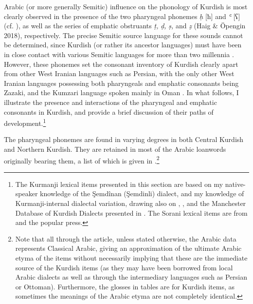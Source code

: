 \documentclass[output=paper]{langsci/langscibook}
\begin{document}
Arabic (or more generally Semitic) influence on the phonology of Kurdish is most clearly observed in the presence of the two pharyngeal phonemes \textit{ḥ} [ħ] and \textit{ʿ} [ʕ] (cf. \citealt{Kahn1976,Haig2007,Anonbyforthcoming,Barryforthcoming}), as well as the series of emphatic obstruants \textit{ṭ,} \textit{ḍ,} \textit{ṣ,} and \textit{ẓ} (Haig \& Öpengin 2018), respectively. The precise Semitic source language for these sounds cannot be determined, since Kurdish (or rather its ancestor languages) must have been in close contact with various Semitic languages for more than two millennia \citep[69]{Utas2005}. However, these phonemes set the consonant inventory of Kurdish clearly apart from other West Iranian languages such as Persian, with the only other West Iranian languages possessing both pharyngeals and emphatic consonants being Zazaki, and the Kumzari language spoken mainly in Oman \citep{Anonbyforthcoming}. In what follows, I illustrate the presence and interactions of the pharyngeal and emphatic consonants in Kurdish, and provide a brief discussion of their paths of development.\footnote{The Kurmanji lexical items presented in this section are based on my native-speaker knowledge of the Şemdînan (Şemdinli) dialect, and my knowledge of Kurmanji-internal dialectal variation, drawing also on \citep{Chyet2003}, \citep{ÖpenginHaig2014}, and the  Manchester Database of Kurdish Dialects presented in \citep{MatrasKoontz-Garboden2016}. The Sorani lexical items are from \citet{Öpengin2016} and the popular press.}  

The pharyngeal phonemes are found in varying degrees in both Central Kurdish and Northern Kurdish. They are retained in most of the Arabic loanwords originally bearing them, a list of which is given in .\footnote{Note that all through the article, unless stated otherwise, the Arabic data represents Classical Arabic, giving an approximation of the ultimate Arabic etyma of the items without necessarily implying that these are the immediate source of the Kurdish items (as they may have been borrowed from local Arabic dialects as well as through the intermediary languages such as Persian or Ottoman). Furthermore, the glosses in tables are for Kurdish items, as sometimes the meanings of the Arabic etyma are not completely identical.} 
\end{document}
